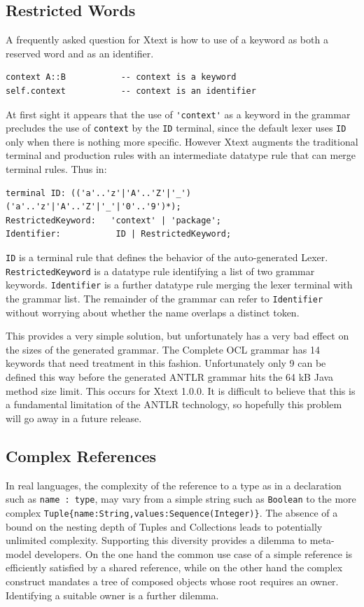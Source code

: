 \documentclass[runningheads,a4paper]{llncs}
\begin{document}
\subsection{Restricted Words}

A frequently asked question for Xtext is how to use of a keyword as both a reserved word and as an identifier. 

{\small\begin{verbatim}
context A::B           -- context is a keyword
self.context           -- context is an identifier
\end{verbatim}}

At first sight it appears that the use of \verb+'context'+ as a keyword in the grammar precludes the use of \verb+context+ by the \verb+ID+ terminal, since the default lexer uses \verb+ID+ only when there is nothing more specific. However Xtext augments the traditional terminal and production rules with an intermediate datatype rule that can merge terminal rules. Thus in:

{\small\begin{verbatim}
terminal ID: (('a'..'z'|'A'..'Z'|'_') ('a'..'z'|'A'..'Z'|'_'|'0'..'9')*);
RestrictedKeyword:   'context' | 'package';
Identifier:           ID | RestrictedKeyword;
\end{verbatim}}
 
\noindent
\verb+ID+ is a terminal rule that defines the behavior of the auto-generated Lexer. 
\verb+RestrictedKeyword+ is a datatype rule identifying a list of two grammar keywords.
\verb+Identifier+ is a further datatype rule merging the lexer terminal with the grammar list.
The remainder of the grammar can refer to \verb+Identifier+ without worrying about whether the name overlaps a distinct token.

This provides a very simple solution, but unfortunately has a very bad effect on the sizes of the generated grammar. The Complete OCL grammar has 14 keywords that need treatment in this fashion. Unfortunately only 9 can be defined this way before the generated ANTLR grammar hits the 64 kB Java method size limit. This occurs for Xtext 1.0.0. It is difficult to believe that this is a fundamental limitation of the ANTLR technology, so hopefully this problem will go away in a future release.

\subsection{Complex References}

In real languages, the complexity of the reference to a type as in a declaration such as \verb+name : type+, may vary from a simple string such as \verb+Boolean+ to the more complex \verb+Tuple{name:String,values:Sequence(Integer)}+. The absence of a bound on the nesting depth of Tuples and Collections leads to potentially unlimited complexity. Supporting this diversity provides a dilemma to meta-model developers. On the one hand the common use case of a simple reference is efficiently satisfied by a shared reference, while on the other hand the complex construct mandates a tree of composed objects whose root requires an owner. Identifying a suitable owner is a further dilemma.
\end{document}
